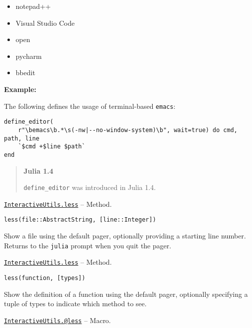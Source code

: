 \begin{adjustwidth}{2em}{0pt}
\begin{itemize}
\item notepad++


\item Visual Studio Code


\item open


\item pycharm


\item bbedit

\end{itemize}
\textbf{Example:}

The following defines the usage of terminal-based \texttt{emacs}:


\begin{lstlisting}
define_editor(
    r"\bemacs\b.*\s(-nw|--no-window-system)\b", wait=true) do cmd, path, line
    `$cmd +$line $path`
end
\end{lstlisting}

\begin{quote}
\textbf{Julia 1.4}

\texttt{define\_editor} was introduced in Julia 1.4.

\end{quote}


\end{adjustwidth}
\hypertarget{449855233258666437}{}
\hyperlink{449855233258666437}{\texttt{InteractiveUtils.less}}  -- {Method.}

\begin{adjustwidth}{2em}{0pt}


\begin{verbatim}
less(file::AbstractString, [line::Integer])
\end{verbatim}

Show a file using the default pager, optionally providing a starting line number. Returns to the \texttt{julia} prompt when you quit the pager.



\end{adjustwidth}
\hypertarget{16005681522948418287}{}
\hyperlink{16005681522948418287}{\texttt{InteractiveUtils.less}}  -- {Method.}

\begin{adjustwidth}{2em}{0pt}


\begin{verbatim}
less(function, [types])
\end{verbatim}

Show the definition of a function using the default pager, optionally specifying a tuple of types to indicate which method to see.



\end{adjustwidth}
\hypertarget{8935326068247481160}{}
\hyperlink{8935326068247481160}{\texttt{InteractiveUtils.@less}}  -- {Macro.}

